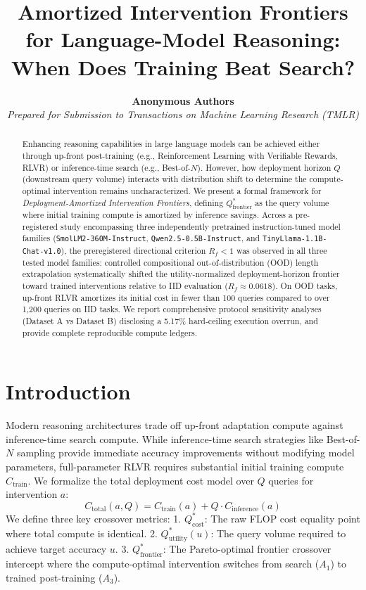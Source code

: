 \documentclass[11pt]{article}
\title{\textbf{Amortized Intervention Frontiers for Language-Model Reasoning: \\ When Does Training Beat Search?}}
\author{\textbf{Anonymous Authors} \\
\textit{Prepared for Submission to Transactions on Machine Learning Research (TMLR)}}
\date{}
\begin{document}
\maketitle


\begin{abstract}
Enhancing reasoning capabilities in large language models can be achieved either through up-front post-training (e.g., Reinforcement Learning with Verifiable Rewards, RLVR) or inference-time search (e.g., Best-of-$N$). However, how deployment horizon $Q$ (downstream query volume) interacts with distribution shift to determine the compute-optimal intervention remains uncharacterized. We present a formal framework for \emph{Deployment-Amortized Intervention Frontiers}, defining $Q^*_{\text{frontier}}$ as the query volume where initial training compute is amortized by inference savings. Across a pre-registered study encompassing three independently pretrained instruction-tuned model families (\texttt{SmolLM2-360M-Instruct}, \texttt{Qwen2.5-0.5B-Instruct}, and \texttt{TinyLlama-1.1B-Chat-v1.0}), the preregistered directional criterion $R_f < 1$ was observed in all three tested model families: controlled compositional out-of-distribution (OOD) length extrapolation systematically shifted the utility-normalized deployment-horizon frontier toward trained interventions relative to IID evaluation ($R_f \approx 0.0618$). On OOD tasks, up-front RLVR amortizes its initial cost in fewer than 100 queries compared to over 1,200 queries on IID tasks. We report comprehensive protocol sensitivity analyses (Dataset A vs Dataset B) disclosing a 5.17\% hard-ceiling execution overrun, and provide complete reproducible compute ledgers.
\end{abstract}

\section{Introduction}
Modern reasoning architectures trade off up-front adaptation compute against inference-time search compute. While inference-time search strategies like Best-of-$N$ sampling provide immediate accuracy improvements without modifying model parameters, full-parameter RLVR requires substantial initial training compute $C_{\text{train}}$. We formalize the total deployment cost model over $Q$ queries for intervention $a$:
\begin{equation}
C_{\text{total}}(a, Q) = C_{\text{train}}(a) + Q \cdot C_{\text{inference}}(a)
\end{equation}
We define three key crossover metrics:
1. $Q^*_{\text{cost}}$: The raw FLOP cost equality point where total compute is identical.
2. $Q^*_{\text{utility}}(u)$: The query volume required to achieve target accuracy $u$.
3. $Q^*_{\text{frontier}}$: The Pareto-optimal frontier crossover intercept where the compute-optimal intervention switches from search ($A_1$) to trained post-training ($A_3$).
\end{document}
